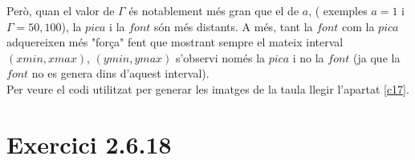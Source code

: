 \documentclass[a4paper, 11pt]{article}
\begin{document}
Però, quan el valor de $\Gamma$ és notablement més gran que el de $a$, ( exemples $a=1$ i $\Gamma=50,100$), la $pica$ i la $font$ són més distants. A més, tant la $font$ com la $pica$ adquereixen més "força" \hspace{0.1em} fent que mostrant sempre el mateix interval $(xmin, xmax)$, $(ymin,ymax)$ s'observi només la $pica$ i no la $font$ (ja que la $font$ no es genera dins d'aquest interval).\\
Per veure el codi utilitzat per generar les imatges de la taula llegir l'apartat \textcolor{blue}{\ref{c17}}.\\

\clearpage
\section{Exercici 2.6.18}
\end{document}
